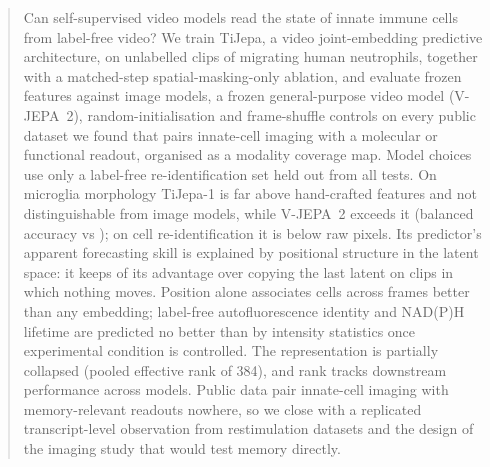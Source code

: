 \begin{abstract}
Can self-supervised video models read the state of innate immune cells from label-free
video? We train TiJepa, a video joint-embedding predictive architecture, on
 unlabelled clips of migrating human neutrophils, together with a
matched-step spatial-masking-only ablation, and evaluate frozen features against image
models, a frozen general-purpose video model (V-JEPA~2), random-initialisation and
frame-shuffle controls on every public dataset we found that pairs innate-cell imaging with
a molecular or functional readout, organised as a modality coverage map. Model choices use
only a label-free re-identification set held out from all tests. On microglia morphology TiJepa-1 is far above hand-crafted features and not
distinguishable from image models, while V-JEPA~2 exceeds it (balanced accuracy
 vs ); on cell re-identification it is
below raw pixels. Its predictor's apparent forecasting skill
is explained by positional structure in the latent space: it keeps 
of its advantage over copying the last latent on clips in which nothing moves. Position
alone associates cells across frames better than any embedding; label-free autofluorescence
identity and NAD(P)H lifetime are predicted no better than by intensity statistics once
experimental condition is controlled. The representation is partially collapsed (pooled
effective rank  of 384), and rank tracks downstream
performance across models. Public data pair innate-cell imaging with memory-relevant
readouts nowhere, so we close with a replicated transcript-level observation from
restimulation datasets and the design of the imaging study that would test memory
directly.
\end{abstract}
